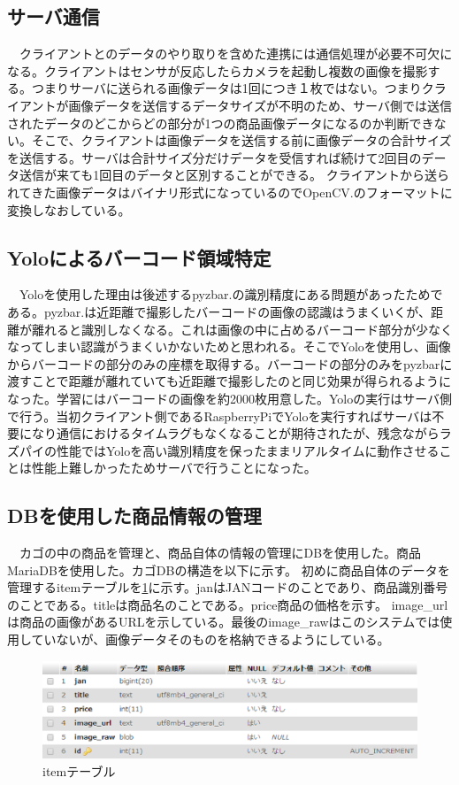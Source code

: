 \newpage

\subsection*{サーバ通信}
　クライアントとのデータのやり取りを含めた連携には通信処理が必要不可欠になる。クライアントはセンサが反応したらカメラを起動し複数の画像を撮影する。つまりサーバに送られる画像データは1回につき１枚ではない。つまりクライアントが画像データを送信するデータサイズが不明のため、サーバ側では送信されたデータのどこからどの部分が1つの商品画像データになるのか判断できない。そこで、クライアントは画像データを送信する前に画像データの合計サイズを送信する。サーバは合計サイズ分だけデータを受信すれば続けて2回目のデータ送信が来ても1回目のデータと区別することができる。
クライアントから送られてきた画像データはバイナリ形式になっているのでOpenCV\cite{opencv}.のフォーマットに変換しなおしている。

\subsection*{Yoloによるバーコード領域特定}
　Yoloを使用した理由は後述するpyzbar\cite{pyzbar}.の識別精度にある問題があったためである。pyzbar\cite{pyzbar}.は近距離で撮影したバーコードの画像の認識はうまくいくが、距離が離れると識別しなくなる。これは画像の中に占めるバーコード部分が少なくなってしまい認識がうまくいかないためと思われる。そこでYoloを使用し、画像からバーコードの部分のみの座標を取得する。バーコードの部分のみをpyzbarに渡すことで距離が離れていても近距離で撮影したのと同じ効果が得られるようになった。学習にはバーコードの画像を約2000枚用意した。Yoloの実行はサーバ側で行う。当初クライアント側であるRaspberryPiでYoloを実行すればサーバは不要になり通信におけるタイムラグもなくなることが期待されたが、残念ながらラズパイの性能ではYoloを高い識別精度を保ったままリアルタイムに動作させることは性能上難しかったためサーバで行うことになった。

\subsection*{DBを使用した商品情報の管理}
　カゴの中の商品を管理と、商品自体の情報の管理にDBを使用した。商品MariaDBを使用した。カゴDBの構造を以下に示す。
初めに商品自体のデータを管理するitemテーブルを\ref{item_db}に示す。janはJANコードのことであり、商品識別番号のことである。titleは商品名のことである。price商品の価格を示す。
image\_urlは商品の画像があるURLを示している。最後のimage\_rawはこのシステムでは使用していないが、画像データそのものを格納できるようにしている。
\begin{figure}[htbp]
\centering
\includegraphics[width=15cm]{./pic/item_db.eps}
\caption{itemテーブル}
\label{item_db}
\end{figure}

